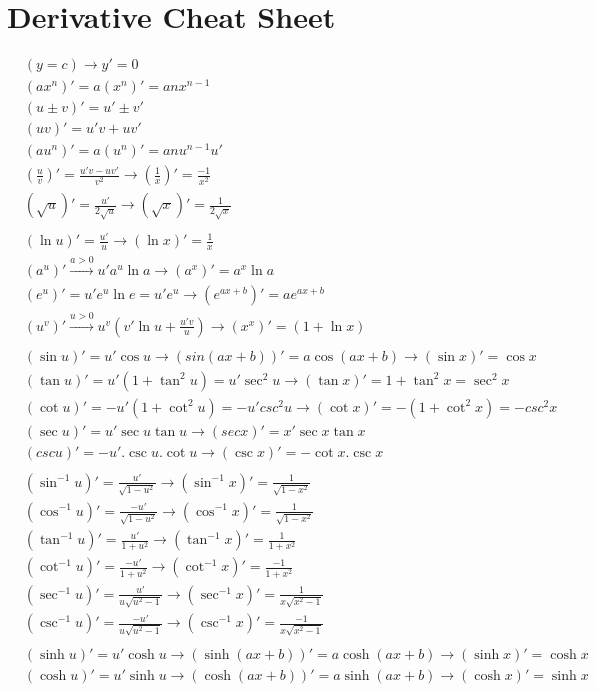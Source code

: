 \newpage
\section{Derivative Cheat Sheet}
\begin{multicols}{2}
\begin{align*}
&(y = c)\to y' = 0 \\
&(ax^n)' = a(x^n)' = anx^{n-1} \\
&(u \pm v)' = u' \pm v' \\
&(uv)' = u'v + uv' \\
&(au^n)' = a(u^n)' = anu^{n-1}u' \\
&(\frac{u}{v})' = \frac{u'v - uv'}{v^2} \to (\frac{1}{x})' = \frac{-1}{x^2} \\
&(\sqrt{u})' = \frac{u'}{2\sqrt{u}} \to (\sqrt{x})' = \frac{1}{2\sqrt{x}} \\
\\
&(\ln u)' = \frac{u'}{u} \to (\ln x)' = \frac{1}{x}  \\
&(a^u)' \overset{a>0}{\longrightarrow} u'a^u\ln a \to (a^x)' = a^x\ln a \\
&(e^u)' = u'e^u\ln e = u'e^u \to (e^{ax+b})' = ae^{ax+b} \\
&(u^v)' \overset{u>0}{\longrightarrow} u^v(v'\ln u+\frac{u'v}{u}) \to (x^x)' = (1 + \ln x) \\
\\
&(\sin u)' = u'\cos u \longrightarrow (sin(ax+b))' = a \cos(ax+b) \longrightarrow (\sin x)' = \cos x \\
&(\tan u)' = u'(1+\tan^2u) = u'\sec^2u \to (\tan x)' = 1+\tan^2 x = \sec^2 x \\
&(\cot u)' = -u'(1+\cot^2u) = -u'csc^2u \to (\cot x)' = -(1+\cot^2x) = -csc^2x \\
&(\sec u)' = u'\sec u \tan u \to (sec x)' = x'\sec x\tan x \\
&(csc u)' = -u'.\csc u.\cot u \to (\csc x)' = -\cot x.\csc x \\
\\
&(\sin^{-1} u)' = \frac{u'}{\sqrt{1-u^2}} \to (\sin^{-1}x)' = \frac{1}{\sqrt{1-x^2}} \\
&(\cos^{-1} u)' = \frac{-u'}{\sqrt{1-u^2}} \to (\cos^{-1}x)' = \frac{1}{\sqrt{1-x^2}} \\
&(\tan^{-1} u)' = \frac{u'}{1+u^2} \to (\tan^{-1}x)' = \frac{1}{1+x^2} \\
&(\cot^{-1} u)' = \frac{-u'}{1+u^2} \to (\cot^{-1}x)' = \frac{-1}{1+x^2} \\
&(\sec^{-1}u)' = \frac{u'}{u\sqrt{u^2-1}} \to (\sec^{-1}x)' = \frac{1}{x\sqrt{x^2-1}} \\
&(\csc^{-1}u)' = \frac{-u'}{u\sqrt{u^2-1}} \to (\csc^{-1}x)' = \frac{-1}{x\sqrt{x^2-1}} \\
\\
&(\sinh u)' = u'\cosh u \to (\sinh(ax+b))' = a\cosh(ax+b) \to (\sinh x)' = \cosh x \\
&(\cosh u)' = u'\sinh u \to (\cosh(ax+b))' = a\sinh(ax+b) \to (\cosh x)' = \sinh x  \\
\end{align*}

\end{multicols}